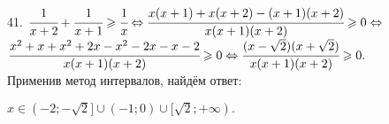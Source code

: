 41. $\cfrac{1}{x+2}+\cfrac{1}{x+1}\geqslant\cfrac{1}{x}\Leftrightarrow \cfrac{x(x+1)+x(x+2)-(x+1)(x+2)}{x(x+1)(x+2)}\geqslant0\Leftrightarrow$\\$
\cfrac{x^2+x+x^2+2x-x^2-2x-x-2}{x(x+1)(x+2)}\geqslant0\Leftrightarrow\cfrac{(x-\sqrt{2})(x+\sqrt{2})}{x(x+1)(x+2)}\geqslant0.$\\ Применив метод интервалов, найдём ответ:
\begin{figure}[ht!]
\end{figure}
$x\in(-2;-\sqrt{2}]\cup(-1;0)\cup[\sqrt{2};+\infty).$\newpage\noindent
